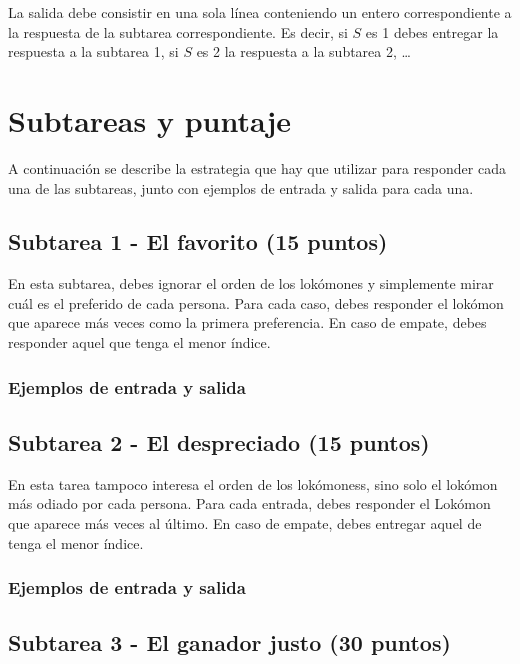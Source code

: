 \documentclass{oci}
\begin{document}
\begin{outputDescription}
La salida debe consistir en una sola línea conteniendo un entero correspondiente
a la respuesta de la subtarea correspondiente.
Es decir, si $S$ es 1 debes entregar la respuesta a la subtarea 1, si $S$ es 2
la respuesta a la subtarea 2, \dots


\newpage
\section*{Subtareas y puntaje}
A continuación se describe la estrategia que hay que utilizar para responder
cada una de las subtareas, junto con ejemplos de entrada y salida para cada una.

\subsection*{Subtarea 1 - El favorito (15 puntos)}
En esta subtarea, debes ignorar el orden de los lokómones y simplemente
mirar cuál es el preferido de cada persona.
Para cada caso, debes responder el lokómon que aparece
más veces como la primera preferencia.
En caso de empate, debes responder aquel que tenga el menor índice. 

\renewenvironment{sampleDescription}{\subsubsection*{Ejemplos de entrada y salida}}{}

\begin{sampleDescription}
\end{sampleDescription}

\subsection*{Subtarea 2 - El despreciado (15 puntos)}

En esta tarea tampoco interesa el orden de los lokómoness, sino solo el lokómon
más odiado por cada persona.
Para cada entrada, debes responder el Lokómon que aparece más veces al último.
En caso de empate, debes entregar aquel de tenga el menor índice.

\begin{sampleDescription}
\end{sampleDescription}

\subsection*{Subtarea 3 - El ganador justo (30 puntos)}


\end{outputDescription}
\end{document}
